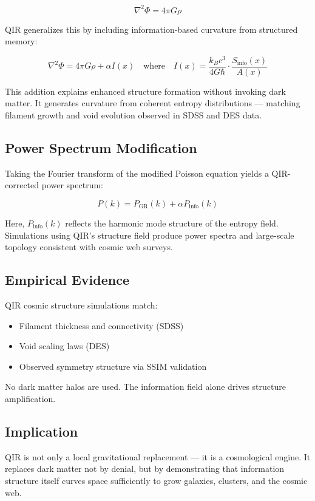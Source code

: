 \documentclass[11pt]{article}
\begin{document}
\[
\nabla^2 \Phi = 4\pi G \rho
\]

QIR generalizes this by including information-based curvature from structured memory:

\[
\nabla^2 \Phi = 4\pi G \rho + \alpha I(x)
\quad \text{where} \quad
I(x) = \frac{k_B c^3}{4 G \hbar} \cdot \frac{S_{\text{info}}(x)}{A(x)}
\]

This addition explains enhanced structure formation without invoking dark matter. It generates curvature from coherent entropy distributions — matching filament growth and void evolution observed in SDSS and DES data.

\subsection*{Power Spectrum Modification}

Taking the Fourier transform of the modified Poisson equation yields a QIR-corrected power spectrum:

\[
P(k) = P_{\text{GR}}(k) + \alpha P_{\text{info}}(k)
\]

Here, \(P_{\text{info}}(k)\) reflects the harmonic mode structure of the entropy field. Simulations using QIR’s structure field produce power spectra and large-scale topology consistent with cosmic web surveys.

\subsection*{Empirical Evidence}

QIR cosmic structure simulations match:
\begin{itemize}
  \item Filament thickness and connectivity (SDSS)
  \item Void scaling laws (DES)
  \item Observed symmetry structure via SSIM validation
\end{itemize}

No dark matter halos are used. The information field alone drives structure amplification.

\subsection*{Implication}

QIR is not only a local gravitational replacement — it is a cosmological engine. It replaces dark matter not by denial, but by demonstrating that information structure itself curves space sufficiently to grow galaxies, clusters, and the cosmic web.
\end{document}
